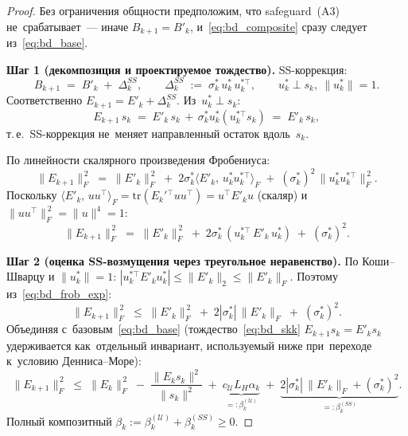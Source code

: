 \begin{proof}
Без ограничения общности предположим, что safeguard~(A3) не~срабатывает~---
иначе $B_{k+1}=B'_k$, и~\eqref{eq:bd_composite} сразу следует из~\eqref{eq:bd_base}.

\medskip
\textbf{Шаг 1 (декомпозиция и проектируемое тождество).}
SS-коррекция:
\[
  B_{k+1} \;=\; B'_k \;+\; \Delta_k^{SS},
  \qquad
  \Delta_k^{SS} \;:=\; \sigma_k^{*}\, u_k^{*}\, u_k^{*\top},
  \qquad u_k^{*}\perp s_k,\ \|u_k^{*}\|=1.
\]
Соответственно $E_{k+1} = E'_k + \Delta_k^{SS}$. Из~$u_k^{*}\perp s_k$:
\begin{equation}\label{eq:bd_skk}
  E_{k+1}\,s_k \;=\; E'_k\, s_k\, +\, \sigma_k^{*} u_k^{*}(u_k^{*\top} s_k) \;=\; E'_k\, s_k,
\end{equation}
т.\,е.\ SS-коррекция не~меняет направленный остаток вдоль~$s_k$.

По линейности скалярного произведения Фробениуса:
\[
  \|E_{k+1}\|_F^{\,2}
  \;=\; \|E'_k\|_F^{\,2}
   \;+\; 2\sigma_k^{*}\langle E'_k,\, u_k^{*} u_k^{*\top}\rangle_F
   \;+\; (\sigma_k^{*})^2\,\|u_k^{*} u_k^{*\top}\|_F^{\,2}.
\]
Поскольку $\langle E'_k,\,u u^{\top}\rangle_F = \mathrm{tr}(E_k'{}^\top uu^\top) = u^{\top}E'_k u$
(скаляр) и~$\|u u^{\top}\|_F^{\,2}=\|u\|^4=1$:
\begin{equation}\label{eq:bd_frob_exp}
  \|E_{k+1}\|_F^{\,2}
  \;=\; \|E'_k\|_F^{\,2}
   \;+\; 2\sigma_k^{*}\,(u_k^{*\top}\,E'_k\,u_k^{*})
   \;+\; (\sigma_k^{*})^2.
\end{equation}

\medskip
\textbf{Шаг 2 (оценка SS-возмущения через треугольное неравенство).}
По Коши--Шварцу и $\|u_k^{*}\|=1$:
$|u_k^{*\top}E'_k u_k^{*}|\le\|E'_k\|_2\le\|E'_k\|_F$. Поэтому из~\eqref{eq:bd_frob_exp}:
\begin{equation}\label{eq:bd_step2}
  \|E_{k+1}\|_F^{\,2}
  \;\le\; \|E'_k\|_F^{\,2}
       \;+\; 2|\sigma_k^{*}|\,\|E'_k\|_F
       \;+\; (\sigma_k^{*})^2.
\end{equation}
Объединяя с~базовым~\eqref{eq:bd_base} (тождество~\eqref{eq:bd_skk}
$E_{k+1}s_k = E'_k s_k$ удерживается как~отдельный инвариант,
используемый ниже при~переходе к~условию Денниса--Море):
\begin{equation}\label{eq:bd_comb}
  \|E_{k+1}\|_F^{\,2}
  \;\le\; \|E_k\|_F^{\,2}
       \;-\; \frac{\|E_k s_k\|^2}{\|s_k\|^2}
       \;+\; \underbrace{c_{\mathcal{U}}L_H\alpha_k}_{=:\beta_k^{(\mathcal{U})}}
       \;+\; \underbrace{2|\sigma_k^{*}|\,\|E'_k\|_F + (\sigma_k^{*})^2}_{=:\beta_k^{(SS)}}.
\end{equation}
Полный композитный $\beta_k:=\beta_k^{(\mathcal{U})}+\beta_k^{(SS)}\ge 0$.


\end{proof}
